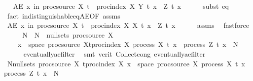 \begin{isabellebody}
\ \isamarkupfalse%
\ {\isachardoublequoteopen}AE\ x\ in\ proc{\isacharunderscore}{\kern0pt}source\ X{\isachardot}{\kern0pt}\ {\isasymforall}t\ {\isasymin}\ proc{\isacharunderscore}{\kern0pt}index\ X{\isachardot}{\kern0pt}\ Y\ t\ x\ {\isacharequal}{\kern0pt}\ Z\ t\ x{\isachardoublequoteclose}\isanewline
\ \ \ \ \isamarkupfalse%
\ {\isacharparenleft}{\kern0pt}subst\ eq{\isacharparenright}{\kern0pt}{\isacharplus}{\kern0pt}\isanewline
\ \ \ \ \isamarkupfalse%
\ {\isacharparenleft}{\kern0pt}fact\ indistinguishable{\isacharunderscore}{\kern0pt}eq{\isacharunderscore}{\kern0pt}AE{\isacharbrackleft}{\kern0pt}OF\ assms{\isacharparenleft}{\kern0pt}{}{\isacharparenright}{\kern0pt}{\isacharbrackright}{\kern0pt}{\isacharparenright}{\kern0pt}\isanewline
\ \ \isamarkupfalse%
\ \isamarkupfalse%
\ {\isachardoublequoteopen}AE\ x\ in\ proc{\isacharunderscore}{\kern0pt}source\ X{\isachardot}{\kern0pt}\ {\isasymforall}t\ {\isasymin}\ proc{\isacharunderscore}{\kern0pt}index\ X{\isachardot}{\kern0pt}\ X\ t\ x\ {\isacharequal}{\kern0pt}\ Z\ t\ x{\isachardoublequoteclose}\isanewline
\ \ \ \ \isamarkupfalse%
\ assms\ \isamarkupfalse%
\ fastforce\isanewline
\ \ \isamarkupfalse%
\ \isamarkupfalse%
\ N\ \ {\isachardoublequoteopen}N\ {\isasymin}\ null{\isacharunderscore}{\kern0pt}sets\ {\isacharparenleft}{\kern0pt}proc{\isacharunderscore}{\kern0pt}source\ X{\isacharparenright}{\kern0pt}{\isachardoublequoteclose}\ \isanewline
\ \ \ \ {\isachardoublequoteopen}{\isacharbraceleft}{\kern0pt}x\ {\isasymin}\ space\ {\isacharparenleft}{\kern0pt}proc{\isacharunderscore}{\kern0pt}source\ X{\isacharparenright}{\kern0pt}{\isachardot}{\kern0pt}{\isasymexists}t{\isasymin}proc{\isacharunderscore}{\kern0pt}index\ X{\isachardot}{\kern0pt}\ process\ X\ t\ x\ {\isasymnoteq}\ process\ Z\ t\ x{\isacharbraceright}{\kern0pt}\ {\isasymsubseteq}\ N{\isachardoublequoteclose}\isanewline
\ \ \ \ \isamarkupfalse%
\ eventually{\isacharunderscore}{\kern0pt}ae{\isacharunderscore}{\kern0pt}filter\ \isamarkupfalse%
\ {\isacharparenleft}{\kern0pt}smt\ {\isacharparenleft}{\kern0pt}verit{\isacharparenright}{\kern0pt}\ Collect{\isacharunderscore}{\kern0pt}cong\ eventually{\isacharunderscore}{\kern0pt}ae{\isacharunderscore}{\kern0pt}filter{\isacharparenright}{\kern0pt}\isanewline
\ \ \isamarkupfalse%
\ \isamarkupfalse%
\ {\isachardoublequoteopen}{\isasymexists}N{\isasymin}null{\isacharunderscore}{\kern0pt}sets\ {\isacharparenleft}{\kern0pt}proc{\isacharunderscore}{\kern0pt}source\ X{\isacharparenright}{\kern0pt}{\isachardot}{\kern0pt}\ {\isasymforall}t{\isasymin}proc{\isacharunderscore}{\kern0pt}index\ X{\isachardot}{\kern0pt}\ {\isacharbraceleft}{\kern0pt}x\ {\isasymin}\ space\ {\isacharparenleft}{\kern0pt}proc{\isacharunderscore}{\kern0pt}source\ X{\isacharparenright}{\kern0pt}{\isachardot}{\kern0pt}\ process\ X\ t\ x\ {\isasymnoteq}\ process\ Z\ t\ x{\isacharbraceright}{\kern0pt}\ {\isasymsubseteq}\ N{\isachardoublequoteclose}\isanewline

\end{isabellebody}
